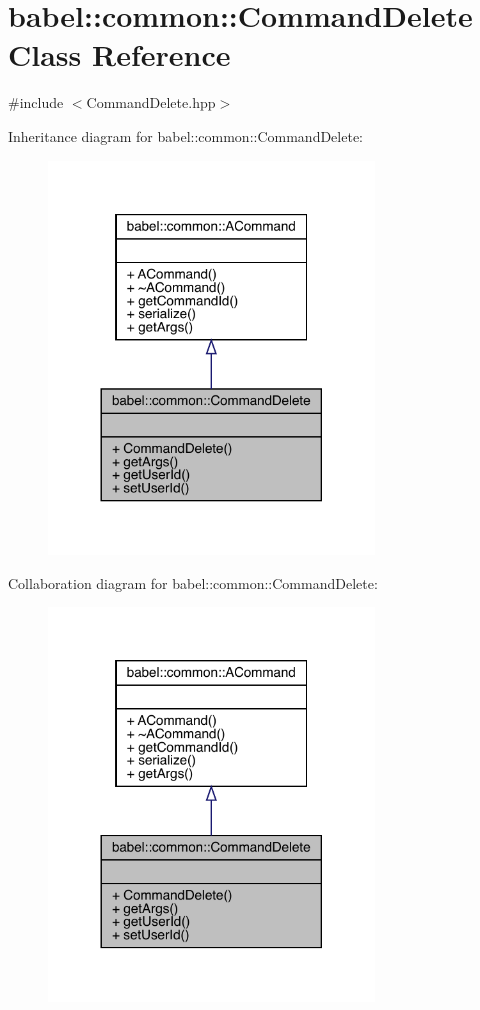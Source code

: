 \hypertarget{classbabel_1_1common_1_1_command_delete}{}\section{babel\+:\+:common\+:\+:Command\+Delete Class Reference}
\label{classbabel_1_1common_1_1_command_delete}


{\ttfamily \#include $<$Command\+Delete.\+hpp$>$}



Inheritance diagram for babel\+:\+:common\+:\+:Command\+Delete\+:\nopagebreak
\begin{figure}[H]
\begin{center}
\leavevmode
\includegraphics[width=245pt]{classbabel_1_1common_1_1_command_delete__inherit__graph}
\end{center}
\end{figure}


Collaboration diagram for babel\+:\+:common\+:\+:Command\+Delete\+:\nopagebreak
\begin{figure}[H]
\begin{center}
\leavevmode
\includegraphics[width=245pt]{classbabel_1_1common_1_1_command_delete__coll__graph}
\end{center}
\end{figure}
